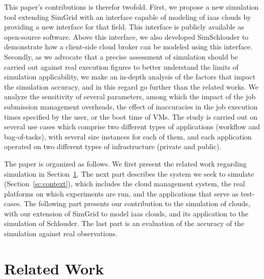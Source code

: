 This  paper's  contributions  is  therefor  twofold. First,  we  propose  a  new
simulation  tool extending  SimGrid with  an  interface capable  of modeling  of
\ac{iaas} clouds by providing a new  interface for that field. This interface is
publicly  available as  open-source  software.  Above  this  interface, we  also
developed  SimSchlouder to  demonstrate how  a client-side  cloud broker  can be
modeled using this interface.
%
Secondly,  as we  advocate that  a precise  assessment of  simulation should  be
carried out  against real execution figures  to better understand the  limits of
simulation  applicability, we  make an  in-depth  analysis of  the factors  that
impact the simulation  accuracy, and in this regard go  further than the related
works. We analyze the sensitivity of  several parameters, among which the impact
of the  job submission management overheads,  the effect of inaccuracies  in the
job execution times specified  by the user, or the boot time  of VMs.  The study
is  carried out  on several  use  cases which  comprise two  different types  of
applications (workflow and  bag-of-tasks), with several size  instances for each
of them, and each application operated  on two different types of infrastructure
(private and public).


The paper is  organized as follows. We first present  the related work regarding
simulation in  Section~\ref{sc:relwork}. The next  part describes the  system we
seek to simulate (Section~\ref{sc:context}), which includes the cloud management
system, the  real platforms on which  experiments are run, and  the applications
that serve  as test-cases. The following  part presents our contribution  to the
simulation of clouds,  with our extension of SimGrid to  model \ac{iaas} clouds,
and  its  application to  the  simulation  of Schlouder.  The  last  part is  an
evaluation of the accuracy of the simulation against real observations.


\section{Related Work}
\label{sc:relwork}

